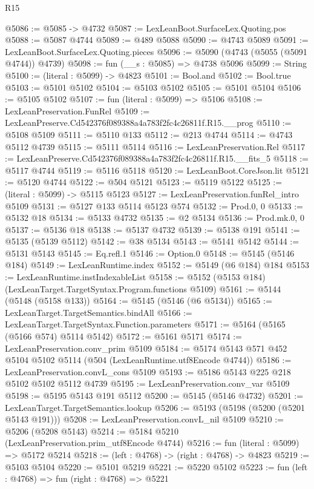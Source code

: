 \begin{lexlean}{R15}
\begin{coremodule}
{{{{{{{{{{{@5086 := @5085 -> @4732
@5087 := LexLeanBoot.SurfaceLex.Quoting.pos
@5088 := @5087 @4744
@5089 := @489 @5088
@5090 := @4743 @5089
@5091 := LexLeanBoot.SurfaceLex.Quoting.pieces
@5096 := @5090 (@4743 (@5055 (@5091 @4744)) @4739)
@5098 := fun (__s : @5085) => @4738 @5096
@5099 := String
@5100 := (literal : @5099) -> @4823
@5101 := Bool.and
@5102 := Bool.true
@5103 := @5101 @5102
@5104 := @5103 @5102
@5105 := @5101 @5104
@5106 := @5105 @5102
@5107 := fun (literal : @5099) => @5106
@5108 := LexLeanPreservation.FunRel
@5109 := LexLeanPreserve.Cd542376f089388a4a783f2fc4c26811f.R15.__prog
@5110 := @5108 @5109
@5111 := @5110 @133
@5112 := @213 @4744
@5114 := @4743 @5112 @4739
@5115 := @5111 @5114
@5116 := LexLeanPreservation.Rel
@5117 := LexLeanPreserve.Cd542376f089388a4a783f2fc4c26811f.R15.__fits_5
@5118 := @5117 @4744
@5119 := @5116 @5118
@5120 := LexLeanBoot.CoreJson.lit
@5121 := @5120 @4744
@5122 := @504 @5121
@5123 := @5119 @5122
@5125 := (literal : @5099) -> @5115 @5123
@5127 := LexLeanPreservation.funRel_intro @5109
@5131 := @5127 @133 @5114 @5123 @574
@5132 := Prod.{0, 0}
@5133 := @5132 @18
@5134 := @5133 @4732
@5135 := @2 @5134
@5136 := Prod.mk.{0, 0}
@5137 := @5136 @18
@5138 := @5137 @4732
@5139 := @5138 @191
@5141 := @5135 (@5139 @5112)
@5142 := @38 @5134
@5143 := @5141 @5142
@5144 := @5131 @5143
@5145 := Eq.refl.{1}
@5146 := Option.{0}
@5148 := @5145 (@5146 @184)
@5149 := LexLeanRuntime.index
@5152 := @5149 (@6 @184) @184
@5153 := LexLeanRuntime.instIndexableList
@5158 := @5152 (@5153 @184) (LexLeanTarget.TargetSyntax.Program.functions @5109)
@5161 := @5144 (@5148 (@5158 @133))
@5164 := @5145 (@5146 (@6 @5134))
@5165 := LexLeanTarget.TargetSemantics.bindAll
@5166 := LexLeanTarget.TargetSyntax.Function.parameters
@5171 := @5164 (@5165 (@5166 @574) @5114 @5142)
@5172 := @5161 @5171
@5174 := LexLeanPreservation.conv_prim @5109
@5184 := @5174 @5143 @571 @452 @5104 @5102 @5114 (@504 (LexLeanRuntime.utf8Encode @4744))
@5186 := LexLeanPreservation.convL_cons @5109
@5193 := @5186 @5143 @225 @218 @5102 @5102 @5112 @4739
@5195 := LexLeanPreservation.conv_var @5109
@5198 := @5195 @5143 @191 @5112
@5200 := @5145 (@5146 @4732)
@5201 := LexLeanTarget.TargetSemantics.lookup
@5206 := @5193 (@5198 (@5200 (@5201 @5143 @191)))
@5208 := LexLeanPreservation.convL_nil @5109
@5210 := @5206 (@5208 @5143)
@5214 := @5184 @5210 (LexLeanPreservation.prim_utf8Encode @4744)
@5216 := fun (literal : @5099) => @5172 @5214
@5218 := (left : @4768) -> (right : @4768) -> @4823
@5219 := @5103 @5104
@5220 := @5101 @5219
@5221 := @5220 @5102
@5223 := fun (left : @4768) => fun (right : @4768) => @5221
}}}}}}}}}}}
\end{coremodule}
\end{lexlean}
